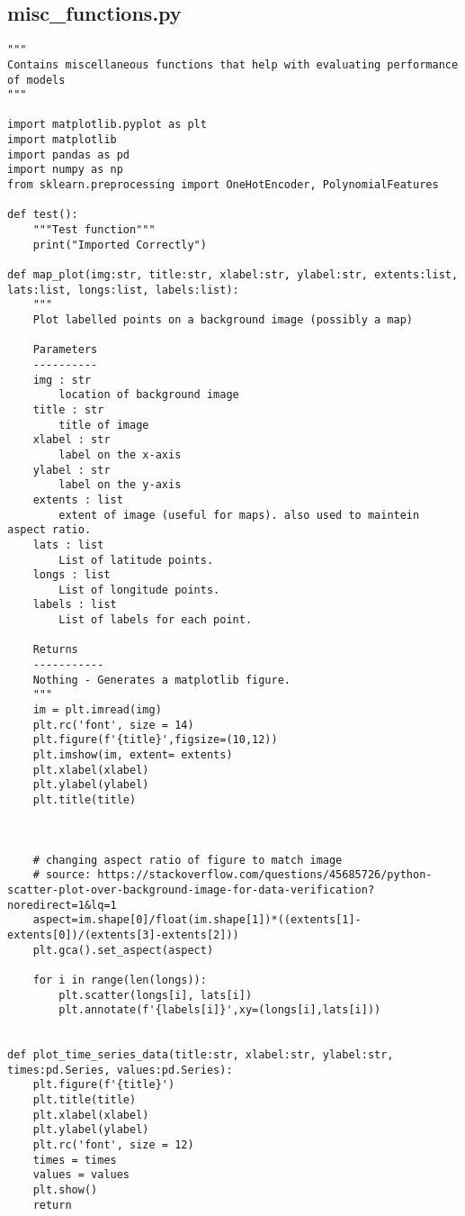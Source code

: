 \subsection{misc\_functions.py}
\begin{verbatim}
"""
Contains miscellaneous functions that help with evaluating performance of models
"""

import matplotlib.pyplot as plt
import matplotlib
import pandas as pd
import numpy as np
from sklearn.preprocessing import OneHotEncoder, PolynomialFeatures

def test():
    """Test function"""
    print("Imported Correctly")

def map_plot(img:str, title:str, xlabel:str, ylabel:str, extents:list, lats:list, longs:list, labels:list):
    """
    Plot labelled points on a background image (possibly a map)

    Parameters
    ----------
    img : str
        location of background image
    title : str
        title of image
    xlabel : str
        label on the x-axis
    ylabel : str
        label on the y-axis
    extents : list
        extent of image (useful for maps). also used to maintein aspect ratio.
    lats : list
        List of latitude points.
    longs : list
        List of longitude points.
    labels : list
        List of labels for each point.

    Returns
    -----------
    Nothing - Generates a matplotlib figure.
    """
    im = plt.imread(img)
    plt.rc('font', size = 14)
    plt.figure(f'{title}',figsize=(10,12))
    plt.imshow(im, extent= extents)
    plt.xlabel(xlabel)
    plt.ylabel(ylabel)
    plt.title(title)


    
    # changing aspect ratio of figure to match image 
    # source: https://stackoverflow.com/questions/45685726/python-scatter-plot-over-background-image-for-data-verification?noredirect=1&lq=1
    aspect=im.shape[0]/float(im.shape[1])*((extents[1]-extents[0])/(extents[3]-extents[2]))
    plt.gca().set_aspect(aspect)

    for i in range(len(longs)):
        plt.scatter(longs[i], lats[i])
        plt.annotate(f'{labels[i]}',xy=(longs[i],lats[i]))


def plot_time_series_data(title:str, xlabel:str, ylabel:str, times:pd.Series, values:pd.Series):
    plt.figure(f'{title}')
    plt.title(title)
    plt.xlabel(xlabel)
    plt.ylabel(ylabel)
    plt.rc('font', size = 12)
    times = times
    values = values
    plt.show()
    return



\end{verbatim}
